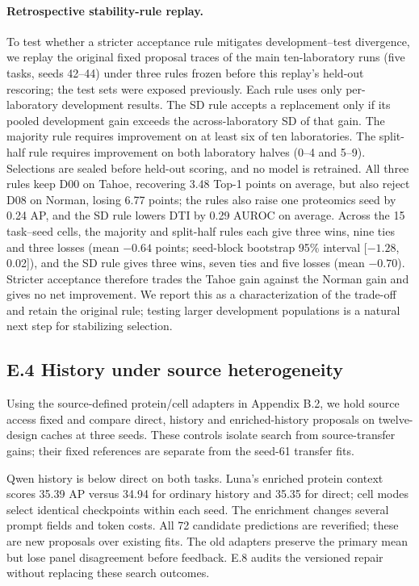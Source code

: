 \paragraph{Retrospective stability-rule replay.} To test whether a stricter acceptance rule mitigates development--test divergence, we replay the original fixed proposal traces of the main ten-laboratory runs (five tasks, seeds 42--44) under three rules frozen before this replay's held-out rescoring; the test sets were exposed previously. Each rule uses only per-laboratory development results. The SD rule accepts a replacement only if its pooled development gain exceeds the across-laboratory SD of that gain. The majority rule requires improvement on at least six of ten laboratories. The split-half rule requires improvement on both laboratory halves (0--4 and 5--9). Selections are sealed before held-out scoring, and no model is retrained. All three rules keep D00 on Tahoe, recovering 3.48 Top-1 points on average, but also reject D08 on Norman, losing 6.77 points; the rules also raise one proteomics seed by 0.24 AP, and the SD rule lowers DTI by 0.29 AUROC on average. Across the 15 task--seed cells, the majority and split-half rules each give three wins, nine ties and three losses (mean $-0.64$ points; seed-block bootstrap 95\% interval [$-1.28$, 0.02]), and the SD rule gives three wins, seven ties and five losses (mean $-0.70$). Stricter acceptance therefore trades the Tahoe gain against the Norman gain and gives no net improvement. We report this as a characterization of the trade-off and retain the original rule; testing larger development populations is a natural next step for stabilizing selection.

\subsection*{E.4 History under source heterogeneity}
Using the source-defined protein/cell adapters in Appendix B.2, we hold source access fixed and compare direct, history and enriched-history proposals on twelve-design caches at three seeds. These controls isolate search from source-transfer gains; their fixed references are separate from the seed-61 transfer fits.



Qwen history is below direct on both tasks. Luna's enriched protein context scores 35.39 AP versus 34.94 for ordinary history and 35.35 for direct; cell modes select identical checkpoints within each seed. The enrichment changes several prompt fields and token costs. All 72 candidate predictions are reverified; these are new proposals over existing fits. The old adapters preserve the primary mean but lose panel disagreement before feedback. E.8 audits the versioned repair without replacing these search outcomes.

